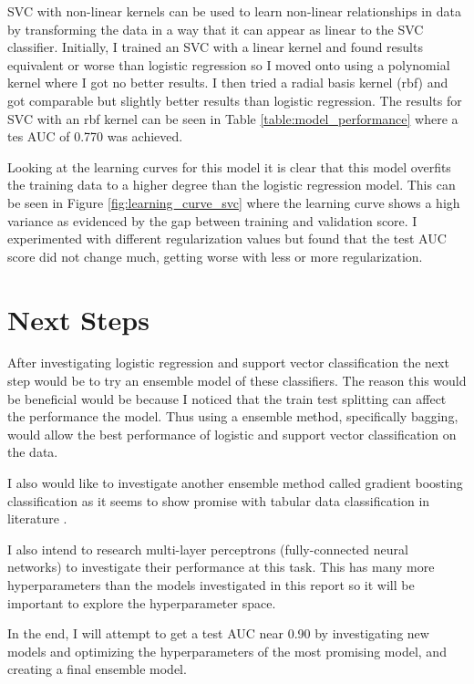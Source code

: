 \documentclass[11pt]{article}
\begin{document}
SVC with non-linear kernels can be used to learn non-linear relationships in data by transforming the data in a way that it can appear as linear to the SVC classifier. 
Initially, I trained an SVC with a linear kernel and found results equivalent or worse than logistic regression so I moved onto using a polynomial kernel where I got no better results.
I then tried a radial basis kernel (rbf) and got comparable but slightly better results than logistic regression.
The results for SVC with an rbf kernel can be seen in Table \ref{table:model_performance} where a tes AUC of 0.770 was achieved. 

Looking at the learning curves for this model it is clear that this model overfits the training data to a higher degree than the logistic regression model.
This can be seen in Figure \ref{fig:learning_curve_svc} where the learning curve shows a high variance as evidenced by the gap between training and validation score.
I experimented with different regularization values but found that the test AUC score did not change much, getting worse with less or more regularization. 

\section*{Next Steps}
After investigating logistic regression and support vector classification the next step would be to try an ensemble model of these classifiers.
The reason this would be beneficial would be because I noticed that the train test splitting can affect the performance the model.
Thus using a ensemble method, specifically bagging, would allow the best performance of logistic and support vector classification on the data.

I also would like to investigate another ensemble method called gradient boosting classification as it seems to show promise with tabular data classification in literature \cite{noauthor_111_nodate}.

I also intend to research multi-layer perceptrons (fully-connected neural networks) to investigate their performance at this task.
This has many more hyperparameters than the models investigated in this report so it will be important to explore the hyperparameter space.

In the end, I will attempt to get a test AUC near 0.90 by investigating new models and optimizing the hyperparameters of the most promising model, and creating a final ensemble model.
\pagebreak
\end{document}
